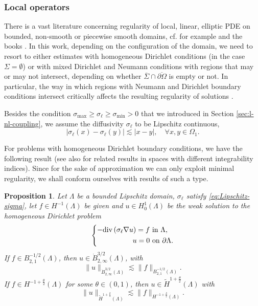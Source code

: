 \documentclass{amsart}
\newcommand{\domain}{\Lambda}
\newcommand{\Ol}{\Omega_{1}}%
\renewcommand{\sl}{{\sigma_\ell}}
\renewcommand{\div}{{\rm div}\,}
\theoremstyle{plain}
\newtheorem{proposition}{Proposition}
\numberwithin{equation}{section}
\numberwithin{table}{section}
\numberwithin{figure}{section}
\numberwithin{theorem}{section}
\numberwithin{corollary}{section}
\numberwithin{definition}{section}
\numberwithin{lemma}{section}
\numberwithin{proposition}{section}
\numberwithin{remark}{section}
\begin{document}
\subsubsection{Local operators}
There is a vast literature concerning regularity of local, linear,  elliptic PDE on bounded, non-smooth or piecewise smooth domains, cf. for example \cite{JeKe95, Savare98, Eb99, EbFr99, Jo99, DiKaRe15, ScSz22} and the books \cite{Grisvard, Costabel_book}.
In this work, depending on the configuration of the domain, we need to resort to either estimates with homogeneous Dirichlet conditions (in the case $\Sigma = \emptyset$) or with mixed Dirichlet and Neumann conditions with regions that may or may not intersect, depending on whether $\overline\Sigma \cap \overline{\partial \Omega}$ is empty or not. 
In particular, the way in which regions with Neumann and Dirichlet boundary conditions intersect critically affects the resulting regularity of solutions \cite{KaMa07}.

Besides the condition $\sigma_{\max}\ge\sl \ge\sigma_{\min}>0$ that we introduced in Section \ref{sec:l-nl-coupling}, we assume the diffusivity $\sl$ to be Lipschitz continuous, 
\begin{equation} \label{eq:Lipschitz-sigma}
|\sl(x) - \sl(y) | \lesssim |x-y| , \quad \forall x, y \in \Ol.
\end{equation}

For problems with homogeneous Dirichlet boundary conditions, we have the following result \cite[Theorem 2]{Savare98} (see also \cite{JeKe95} for related results in spaces with different integrability indices). Since for the sake of approximation we can only exploit minimal regularity, we shall conform ourselves with results of such a type.

\begin{proposition} \label{prop:local-regularity-dir}
Let $\domain$ be a bounded Lipschitz domain, $\sl$ satisfy \eqref{eq:Lipschitz-sigma}, let $f \in H^{-1}(\domain)$ be given and $u \in H^1_0(\domain)$ be the weak solution to the homogeneous Dirichlet problem
\[
 \left\lbrace \begin{aligned}
-\div (\sl \nabla u) = f  & \mbox{ in } \domain, \\
u = 0 & \mbox{ on } \partial\domain.
\end{aligned} \right.
\]
If $f\in B^{-1/2}_{2,1}(\domain)$, then $u \in \dot B^{3/2}_{2,\infty}(\domain)$, with 
\begin{equation*}\label{eq:local-bes-regularity-max}
  \| u \|_{\dot{B}^{3/2}_{2,\infty}(\domain)} \lesssim  \| f \|_{B^{-1/2}_{2,1}(\domain)}.
\end{equation*}
If $f\in H^{-1+\frac\theta{2}}(\domain)$ for some $\theta \in (0,1)$, then $u \in \widetilde{H}^{1+ \frac\theta{2}}(\domain)$ with
\begin{equation}\label{eq:local-sob-regularity-intermediate}
  \| u \|_{\widetilde{H}^{1+ \frac\theta{2}}(\domain)} \lesssim  \| f \|_{H^{-1+ \frac\theta{2}}(\domain)}.
\end{equation}
\end{proposition}
\end{document}
